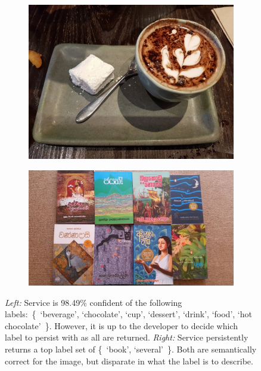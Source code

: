 \begin{figure}[t]
  \centering
  \begin{subfigure}[b]{0.49\linewidth}
    \centering
    \includegraphics[width=.8\linewidth]{1276}  
    \caption{}
    \label{icsme2019:fig:sample-images:coffee}
  \end{subfigure}
  \hfill
  \begin{subfigure}[b]{0.49\linewidth}
    \centering
    \includegraphics[width=.8\linewidth]{0107} 
    \caption{}
    \label{icsme2019:fig:sample-images:books}
  \end{subfigure}
  \caption[Computer vision services can return multiple top labels]{
    \textit{Left:} Service \awsapi{} is 98.49\% confident of the following labels:~\{~`beverage', `chocolate', `cup', `dessert', `drink', `food', `hot chocolate'~\}. However, it is up to the developer to decide which label to persist with as all are returned.
    \textit{Right:} Service \azureapi{} persistently returns a top label set of \{~`book', `several'~\}. Both are semantically correct for the image, but disparate in what the label is to describe.
    }
\end{figure}


